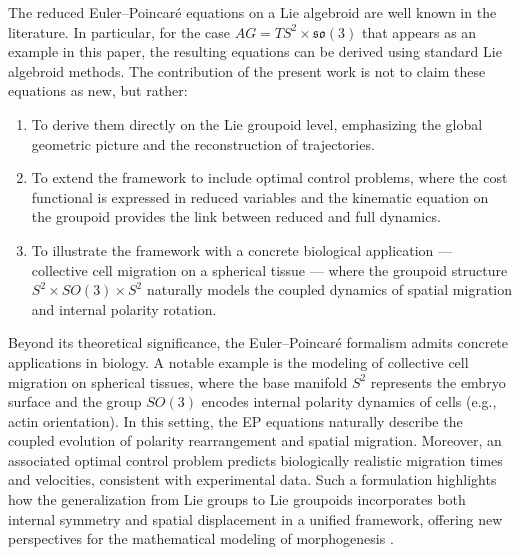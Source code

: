 \documentclass{article}
\begin{document}

The reduced Euler--Poincar\'e equations on a Lie algebroid are well known in the literature. In particular, for the case $AG = TS^2 \times \mathfrak{so}(3)$ that appears as an example in this paper, the resulting equations can be derived using standard Lie algebroid methods. The contribution of the present work is not to claim these equations as new, but rather:

\begin{enumerate}
\item To derive them directly on the Lie groupoid level, emphasizing the global geometric picture and the reconstruction of trajectories.
\item To extend the framework to include optimal control problems, where the cost functional is expressed in reduced variables and the kinematic equation on the groupoid provides the link between reduced and full dynamics.
\item To illustrate the framework with a concrete biological application — collective cell migration on a spherical tissue — where the groupoid structure $S^2 \times SO(3) \times S^2$ naturally models the coupled dynamics of spatial migration and internal polarity rotation.
\end{enumerate}


Beyond its theoretical significance, the Euler--Poincar\'e formalism admits concrete applications in biology. A notable example is the modeling of collective cell migration on spherical tissues, where the base manifold $S^2$ represents the embryo surface and the group $SO(3)$ encodes internal polarity dynamics of cells (e.g., actin orientation). In this setting, the EP equations naturally describe the coupled evolution of polarity rearrangement and spatial migration. Moreover, an associated optimal control problem predicts biologically realistic migration times and velocities, consistent with experimental data. Such a formulation highlights how the generalization from Lie groups to Lie groupoids incorporates both internal symmetry and spatial displacement in a unified framework, offering new perspectives for the mathematical modeling of morphogenesis \cite{GrGl, ViZa, Ed, DrHo, AlTr}.
\end{document}
